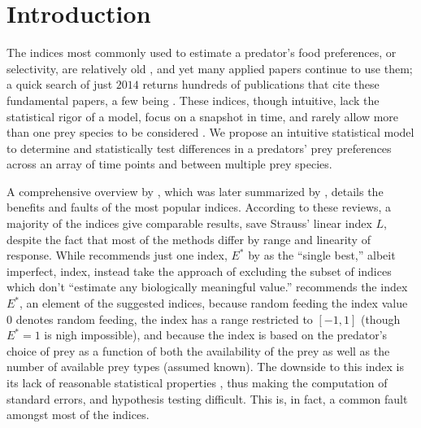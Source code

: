 \section{Introduction}
\label{sec:intro}

The indices most commonly used to estimate a predator's food preferences, or selectivity, are relatively old \citep{Ivlev:1964,Jacobs:1974,Chesson:1978,Strauss:1979,Vanderploeg:1979,Chesson:1983}, and yet many applied papers continue to use them; a quick search of just $2014$ returns hundreds of publications that cite these fundamental papers, a few being \citet{Clements:2014,Hansen:2014,Hellstrom:2014,Lyngdoh:2014,Madduppa:2014}.  These indices, though intuitive, lack the statistical rigor of a model, focus on a snapshot in time, and rarely allow more than one prey species to be considered \citep{Lechowicz:1982}.  We propose an intuitive statistical model to determine and statistically test differences in a predators' prey preferences across an array of time points and between multiple prey species.   

A comprehensive overview by \citet{Lechowicz:1982}, which was later summarized by \citet{Manly:1992}, details the benefits and faults of the most popular indices.  According to these reviews, a majority of the indices give comparable results, save Strauss' linear index $L$, despite the fact that most of the methods differ by range and linearity of response.  While \citet{Lechowicz:1982} recommends just one index, $E^*$ by \citet{Vanderploeg:1979} as the ``single best,'' albeit imperfect, index, \citet{Manly:1992} instead take the approach of excluding the subset of indices which don't ``estimate any biologically meaningful value.''  \citet{Lechowicz:1982} recommends the index $E^*$, an element of the \citet{Manly:1992} suggested indices, because random feeding the index value $0$ denotes random feeding, the index has a range restricted to $[-1,1]$ (though $E^*=1$ is nigh impossible), and because the index is based on the predator's choice of prey as a function of both the availability of the prey as well as the number of available prey types (assumed known).  The downside to this index is its lack of reasonable statistical properties \citep{Lechowicz:1982}, thus making the computation of standard errors, and hypothesis testing difficult.  This is, in fact, a common fault amongst most of the indices.  

